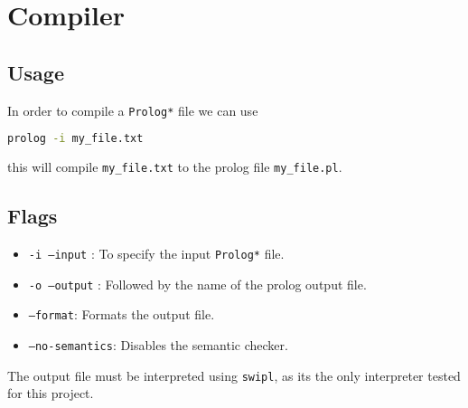 \section{Compiler}

\subsection{Usage}

In order to compile a \texttt{Prolog*} file we can use 

\begin{lstlisting}[language = bash]
    prolog -i my_file.txt 
\end{lstlisting}

this will compile \texttt{my\_file.txt} to the prolog file \texttt{my\_file.pl}. 


\subsection{Flags}
\begin{itemize}
    \item \texttt{-i --input} : To specify the input \texttt{Prolog*} file.
    \item \texttt{-o --output} : Followed by the name of the prolog output file.
    \item \texttt{--format}: Formats the output file.
    \item \texttt{--no-semantics}: Disables the semantic checker.
\end{itemize}

\begin{note}
    The output file must be interpreted using \texttt{swipl}, as its the only interpreter tested
    for this project.
\end{note}

